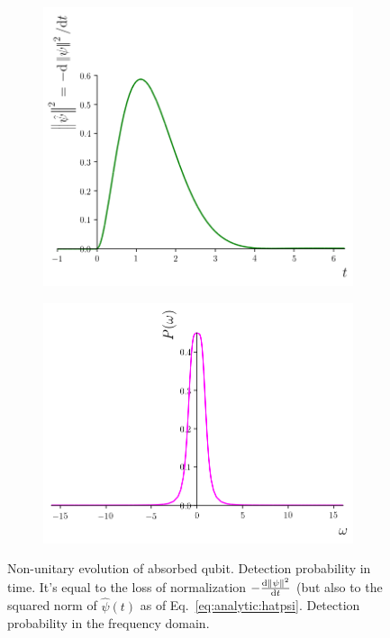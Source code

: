 \begin{figure}
  \centering
  \begin{subfigure}[b]{0.49\textwidth}
    \includegraphics[width=\linewidth]{img/2ldetect/qubit_normalization_loss.png}
    \subcaption{}\label{fig:absorbed-qubit-normalization-loss:t}
  \end{subfigure}
  \begin{subfigure}[b]{0.49\textwidth}
    \includegraphics[width=\linewidth]{img/2ldetect/P_omega.png}
    \subcaption{}\label{fig:absorbed-qubit-normalization-loss:omega}
  \end{subfigure}
  \caption[
    Non-unitary evolution of absorbed qubit (cont.)
  ]{
    Non-unitary evolution of absorbed qubit.
      Detection probability in time. It's equal to the
      loss of normalization $-\dv{\norm{\psi}^2}{t}$
      (but also to the squared norm of $\hat{\psi}(t)$ as of Eq.~\eqref{eq:analytic:hatpsi}.
      Detection probability in the frequency domain.
  }
  \label{fig:absorbed-qubit-normalization-loss}
\end{figure}

